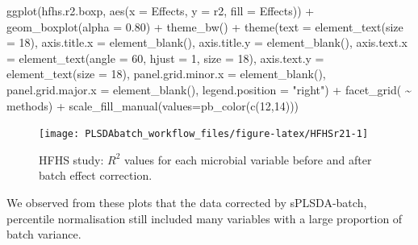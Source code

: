 \documentclass[
]{book}
\newenvironment{Shaded}{\begin{snugshade}}{\end{snugshade}}
\newcommand{\AttributeTok}[1]{\textcolor[rgb]{0.77,0.63,0.00}{#1}}
\newcommand{\DecValTok}[1]{\textcolor[rgb]{0.00,0.00,0.81}{#1}}
\newcommand{\FloatTok}[1]{\textcolor[rgb]{0.00,0.00,0.81}{#1}}
\newcommand{\FunctionTok}[1]{\textcolor[rgb]{0.00,0.00,0.00}{#1}}
\newcommand{\NormalTok}[1]{#1}
\newcommand{\SpecialCharTok}[1]{\textcolor[rgb]{0.00,0.00,0.00}{#1}}
\newcommand{\StringTok}[1]{\textcolor[rgb]{0.31,0.60,0.02}{#1}}
\begin{document}
\begin{Shaded}
\begin{Highlighting}[]
\FunctionTok{ggplot}\NormalTok{(hfhs.r2.boxp, }\FunctionTok{aes}\NormalTok{(}\AttributeTok{x =}\NormalTok{ Effects, }\AttributeTok{y =}\NormalTok{ r2, }\AttributeTok{fill =}\NormalTok{ Effects)) }\SpecialCharTok{+}
  \FunctionTok{geom\_boxplot}\NormalTok{(}\AttributeTok{alpha =} \FloatTok{0.80}\NormalTok{) }\SpecialCharTok{+}
  \FunctionTok{theme\_bw}\NormalTok{() }\SpecialCharTok{+} 
  \FunctionTok{theme}\NormalTok{(}\AttributeTok{text =} \FunctionTok{element\_text}\NormalTok{(}\AttributeTok{size =} \DecValTok{18}\NormalTok{),}
        \AttributeTok{axis.title.x =} \FunctionTok{element\_blank}\NormalTok{(),}
        \AttributeTok{axis.title.y =} \FunctionTok{element\_blank}\NormalTok{(),}
        \AttributeTok{axis.text.x =} \FunctionTok{element\_text}\NormalTok{(}\AttributeTok{angle =} \DecValTok{60}\NormalTok{, }\AttributeTok{hjust =} \DecValTok{1}\NormalTok{, }\AttributeTok{size =} \DecValTok{18}\NormalTok{),}
        \AttributeTok{axis.text.y =} \FunctionTok{element\_text}\NormalTok{(}\AttributeTok{size =} \DecValTok{18}\NormalTok{),}
        \AttributeTok{panel.grid.minor.x =} \FunctionTok{element\_blank}\NormalTok{(),}
        \AttributeTok{panel.grid.major.x =} \FunctionTok{element\_blank}\NormalTok{(),}
        \AttributeTok{legend.position =} \StringTok{"right"}\NormalTok{) }\SpecialCharTok{+} \FunctionTok{facet\_grid}\NormalTok{( }\SpecialCharTok{\textasciitilde{}}\NormalTok{ methods) }\SpecialCharTok{+} 
  \FunctionTok{scale\_fill\_manual}\NormalTok{(}\AttributeTok{values=}\FunctionTok{pb\_color}\NormalTok{(}\FunctionTok{c}\NormalTok{(}\DecValTok{12}\NormalTok{,}\DecValTok{14}\NormalTok{))) }
\end{Highlighting}
\end{Shaded}

\begin{figure}

{\centering \texttt{[image: PLSDAbatch\_workflow\_files/figure-latex/HFHSr21-1]} 

}

\caption{HFHS study: $R^2$ values for each microbial variable before and after batch effect correction.}\label{fig:HFHSr21}
\end{figure}

We observed from these plots that the data corrected by sPLSDA-batch, percentile normalisation still included many variables with a large proportion of batch variance.
\end{document}
